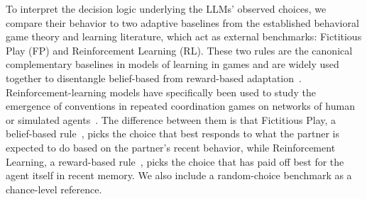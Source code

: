 \documentclass{article}
\begin{document}
To interpret the decision logic underlying the LLMs' observed choices, we compare their behavior to two adaptive baselines from the established behavioral game theory and learning literature, which act as external benchmarks: Fictitious Play (FP) and Reinforcement Learning (RL). These two rules are the canonical complementary baselines in models of learning in games and are widely used together to disentangle belief-based from reward-based adaptation~\cite{brown1951iterative,robinson1951iterative,erev1998predicting,camerer1999ewa,fudenberg1998theory}. Reinforcement-learning models have specifically been used to study the emergence of conventions in repeated coordination games on networks of human or simulated agents~\cite{nunner2022role}. The difference between them is that Fictitious Play, a belief-based rule~\cite{brown1951iterative,fudenberg1998theory}, picks the choice that best responds to what the partner is expected to do based on the partner's recent behavior, while Reinforcement Learning, a reward-based rule~\cite{erev1998predicting,sutton2018reinforcement}, picks the choice that has paid off best for the agent itself in recent memory. We also include a random-choice benchmark as a chance-level reference. 
\end{document}

